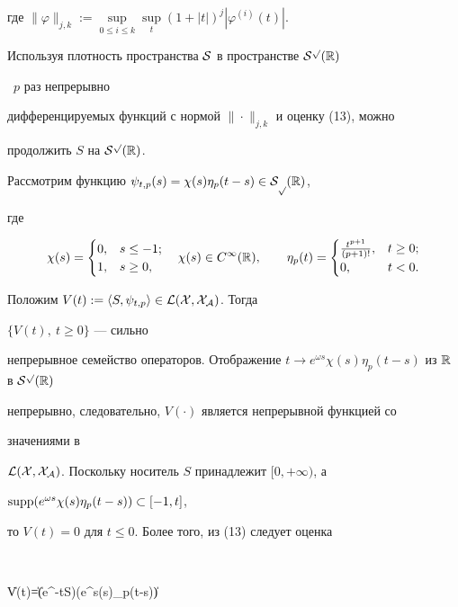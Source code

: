 где $\|\varphi\|_{j,k}:=\sup\limits_{0\le i\le k}\sup\limits_t 


(1+|t|)^j|\varphi^{(i)}(t)|$. 


Используя плотность пространства $\cal S$ в пространстве $\cal S^p(\Bbb R)$ 


\ $p$ раз непрерывно 


дифференцируемых функций с нормой $\|\cdot\|_{j,k}$ и оценку (13), можно 


продолжить $S$ на $\cal S^p(\Bbb R)$. 


Рассмотрим функцию $\psi_{t,p}(s)=\chi(s)\eta_p(t-s)\in\cal S_p(\Bbb R)$, 


где 


$$ 


\chi(s)= 


\begin{cases} 


0, & s\le-1; \\ 1, & s\ge0, 


\end{cases} 


\quad \chi(s)\in C^\infty(\Bbb R),\qquad 


\eta_p(t)= 


\begin{cases} 


\frac{t^{p+1}}{(p+1)!}, & t\ge0; \\ 0, & t<0. 


\end{cases} 


$$ 


Положим $V(t):=\langle S,\psi_{t,p}\rangle\in\cal L(X,X_{\cal A})$. Тогда 


$\{V(t),\ t\ge0\}$ --- сильно 


непрерывное семейство операторов. Отображение $t\to e^{\omega 


s}\chi(s)\eta_p(t-s)$ из $\Bbb R$ в $\cal S^p(\Bbb R)$ 


непрерывно, следовательно, $V(\cdot)$ является непрерывной функцией со 


значениями в 


$\cal L(X,X_{\cal A})$. Поскольку носитель $S$ принадлежит $[0,+\infty)$, а 


$\operatorname{supp}(e^{\omega s}\chi(s)\eta_p(t-s))\subset[-1,t]$, 


то $V(t)=0$ для $t\le0$. Более того, из (13) следует оценка 


$$ 


\|V(t)\|=\|(e^{-\omega t}S)(e^{\omega s}\chi(s)\eta_p(t-s))\|\le 


